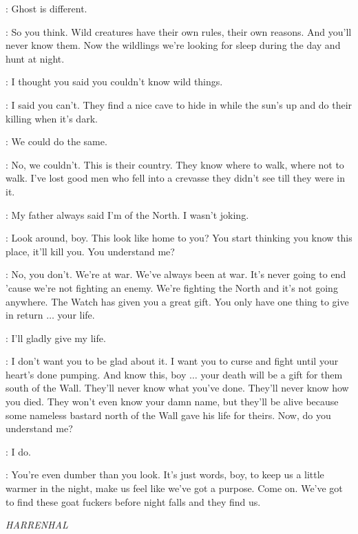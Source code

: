 \JON: Ghost is different. 

\HALFHAND: So you think. Wild creatures have their own rules, their own reasons. And you'll never know them. Now the wildlings we're looking for sleep during the day and hunt at night. 

\JON: I thought you said you couldn't know wild things. 

\HALFHAND: I said you can't. They find a nice cave to hide in while the sun's up and do their killing when it's dark. 

\JON: We could do the same. 

\HALFHAND: No, we couldn't. This is their country. They know where to walk, where not to walk. I've lost good men who fell into a crevasse they didn't see till they were in it. 

\JON: My father always said I'm of the North.   I wasn't joking. 

\HALFHAND: Look around, boy. This look like home to you? You start thinking you know this place, it'll kill you. You understand me? 


\HALFHAND: No, you don't. We're at war. We've always been at war. It's never going to end 'cause we're not fighting an enemy. We're fighting the North and it's not going anywhere. The Watch has given you a great gift. You only have one thing to give in return $\ldots$ your life. 

\JON: I'll gladly give my life. 

\HALFHAND: I don't want you to be glad about it. I want you to curse and fight until your heart's done pumping. 
And know this, boy $\ldots$ your death will be a gift for them south of the Wall. They'll never know what you've done. They'll never know how you died. They won't even know your damn name, but they'll be alive because some nameless bastard north of the Wall gave his life for theirs. Now, do you understand me? 

\JON: I do. 

\HALFHAND: You're even dumber than you look. It's just words, boy, to keep us a little warmer in the night, make us feel like we've got a purpose. Come on. We've got to find these goat fuckers before night falls and they find us. 


\scene

\textit{HARRENHAL} 


